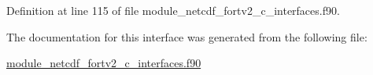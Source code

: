 Definition at line 115 of file module\+\_\+netcdf\+\_\+fortv2\+\_\+c\+\_\+interfaces.\+f90.



The documentation for this interface was generated from the following file\+:\begin{DoxyCompactItemize}
\item 
\hyperlink{module__netcdf__fortv2__c__interfaces_8f90}{module\+\_\+netcdf\+\_\+fortv2\+\_\+c\+\_\+interfaces.\+f90}\end{DoxyCompactItemize}
